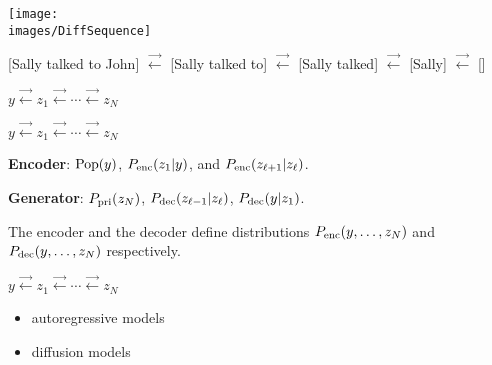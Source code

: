 {


\centerline{\texttt{[image: \\images/DiffSequence]}}

\vfill
{\huge
\centerline{{\color{red} [Sally talked to John]} $\stackrel{\rightarrow}{\leftarrow}$ {\color{red} [Sally talked to]}
$\stackrel{\rightarrow}{\leftarrow}$ {\color{red}[Sally talked]} $\stackrel{\rightarrow}{\leftarrow}$ {\color{red}[Sally]} $\stackrel{\rightarrow}{\leftarrow}$ {\color{red} []}}
}

\vfill
\centerline{$y \stackrel{\rightarrow}{\leftarrow} z_1  \stackrel{\rightarrow}{\leftarrow} \cdots \stackrel{\rightarrow}{\leftarrow} z_N$}

\centerline{$y \stackrel{\rightarrow}{\leftarrow} z_1  \stackrel{\rightarrow}{\leftarrow} \cdots \stackrel{\rightarrow}{\leftarrow} z_N$}

\vfill
{\bf Encoder}: $\mathrm{Pop}(y)$, $P_{\mathrm{enc}}(z_1|y)$, and $P_{\mathrm{enc}}(z_{\ell+1}|z_\ell)$.


\vfill
{\bf Generator}: $P_{\mathrm{pri}}(z_N)$, $P_{\mathrm{dec}}(z_{\ell-1}|z_\ell)$, $P_{\mathrm{dec}}(y|z_1)$.

\vfill
The encoder and the decoder define distributions $P_{\mathrm{enc}}(y,\ldots,z_N)$ and $P_{\mathrm{dec}}(y,\ldots,z_N)$ respectively.



\centerline{$y \stackrel{\rightarrow}{\leftarrow} z_1  \stackrel{\rightarrow}{\leftarrow} \cdots \stackrel{\rightarrow}{\leftarrow} z_N$}

\vfill
\begin{itemize}
\item autoregressive models

\vfill
\item diffusion models
\end{itemize}



}
